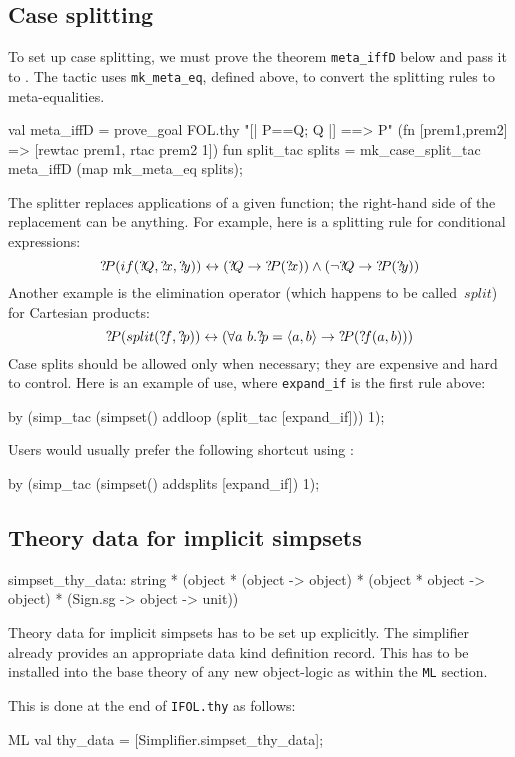 \subsection{Case splitting}

To set up case splitting, we must prove the theorem \texttt{meta_iffD}
below and pass it to .  The tactic
 uses \texttt{mk_meta_eq}, defined above, to
convert the splitting rules to meta-equalities.
\begin{ttbox}
val meta_iffD = 
    prove_goal FOL.thy "[| P==Q; Q |] ==> P"
        (fn [prem1,prem2] => [rewtac prem1, rtac prem2 1])
\ttbreak
fun split_tac splits =
    mk_case_split_tac meta_iffD (map mk_meta_eq splits);
\end{ttbox}
%
The splitter replaces applications of a given function; the right-hand side
of the replacement can be anything.  For example, here is a splitting rule
for conditional expressions:
\[ \Var{P}(if(\Var{Q},\Var{x},\Var{y})) \bimp (\Var{Q} \imp \Var{P}(\Var{x}))
\conj (\lnot\Var{Q} \imp \Var{P}(\Var{y})) 
\] 
Another example is the elimination operator (which happens to be
called~$split$) for Cartesian products:
\[ {?\!P}(split({?\!f},{?\!p})) \leftrightarrow (\forall a~b. {?\!p} =
\langle a,b\rangle \rightarrow {?\!P}({?\!f}(a,b))) 
\] 
Case splits should be allowed only when necessary; they are expensive
and hard to control.  Here is an example of use, where \texttt{expand_if}
is the first rule above:
\begin{ttbox}
by (simp_tac (simpset() addloop (split_tac [expand_if])) 1);
\end{ttbox}
Users would usually prefer the following shortcut using
:
\begin{ttbox}
by (simp_tac (simpset() addsplits [expand_if]) 1);
\end{ttbox}


\subsection{Theory data for implicit simpsets}
\begin{ttbox}
simpset_thy_data: string * (object * (object -> object) *
    (object * object -> object) * (Sign.sg -> object -> unit))
\end{ttbox}

Theory data for implicit simpsets has to be set up explicitly.  The
simplifier already provides an appropriate data kind definition
record.  This has to be installed into the base theory of any new
object-logic as  within the \texttt{ML} section.

This is done at the end of \texttt{IFOL.thy} as follows:
\begin{ttbox}
ML val thy_data = [Simplifier.simpset_thy_data];
\end{ttbox}


